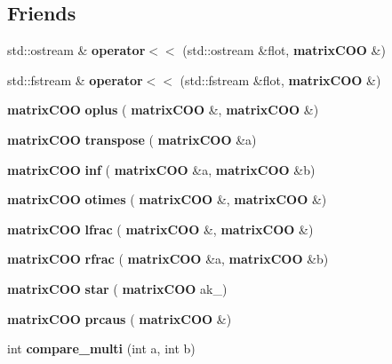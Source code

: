 \subsection*{Friends}
\begin{DoxyCompactItemize}
\item 
\mbox{\label{classmmgd_1_1matrix_c_o_o_a8983561a655600a8d226879f47f29e4d}} 
std\+::ostream \& {\bfseries operator$<$$<$} (std\+::ostream \&flot, \textbf{ matrix\+C\+OO} \&)
\item 
\mbox{\label{classmmgd_1_1matrix_c_o_o_aa75084e7bc3923efe16218b657b59e80}} 
std\+::fstream \& {\bfseries operator$<$$<$} (std\+::fstream \&flot, \textbf{ matrix\+C\+OO} \&)
\item 
\mbox{\label{classmmgd_1_1matrix_c_o_o_a3a70e5ffbdc8520a4a63c0cf6d319c9d}} 
\textbf{ matrix\+C\+OO} {\bfseries oplus} (\textbf{ matrix\+C\+OO} \&, \textbf{ matrix\+C\+OO} \&)
\item 
\mbox{\label{classmmgd_1_1matrix_c_o_o_a6fe4a427ff93fd3c97e40d7a41194a2b}} 
\textbf{ matrix\+C\+OO} {\bfseries transpose} (\textbf{ matrix\+C\+OO} \&a)
\item 
\mbox{\label{classmmgd_1_1matrix_c_o_o_a97434898782e0549469abe94f158af37}} 
\textbf{ matrix\+C\+OO} {\bfseries inf} (\textbf{ matrix\+C\+OO} \&a, \textbf{ matrix\+C\+OO} \&b)
\item 
\mbox{\label{classmmgd_1_1matrix_c_o_o_a5d8fde5d0995bf38b8ef40c75db309dd}} 
\textbf{ matrix\+C\+OO} {\bfseries otimes} (\textbf{ matrix\+C\+OO} \&, \textbf{ matrix\+C\+OO} \&)
\item 
\mbox{\label{classmmgd_1_1matrix_c_o_o_a0a1ff39f49d961446403d84f6418cf35}} 
\textbf{ matrix\+C\+OO} {\bfseries lfrac} (\textbf{ matrix\+C\+OO} \&, \textbf{ matrix\+C\+OO} \&)
\item 
\mbox{\label{classmmgd_1_1matrix_c_o_o_adf214e3a706ad88da1ad700a9834e152}} 
\textbf{ matrix\+C\+OO} {\bfseries rfrac} (\textbf{ matrix\+C\+OO} \&a, \textbf{ matrix\+C\+OO} \&b)
\item 
\mbox{\label{classmmgd_1_1matrix_c_o_o_af1f8bb74ab10dc8414bd4ca29d46f21f}} 
\textbf{ matrix\+C\+OO} {\bfseries star} (\textbf{ matrix\+C\+OO} ak\+\_)
\item 
\mbox{\label{classmmgd_1_1matrix_c_o_o_acedd4ff9e3944f7c658b1ed418f37ac6}} 
\textbf{ matrix\+C\+OO} {\bfseries prcaus} (\textbf{ matrix\+C\+OO} \&)
\item 
\mbox{\label{classmmgd_1_1matrix_c_o_o_a5a402de41b8a938df509553894c01fee}} 
int {\bfseries compare\+\_\+multi} (int a, int b)
\end{DoxyCompactItemize}


